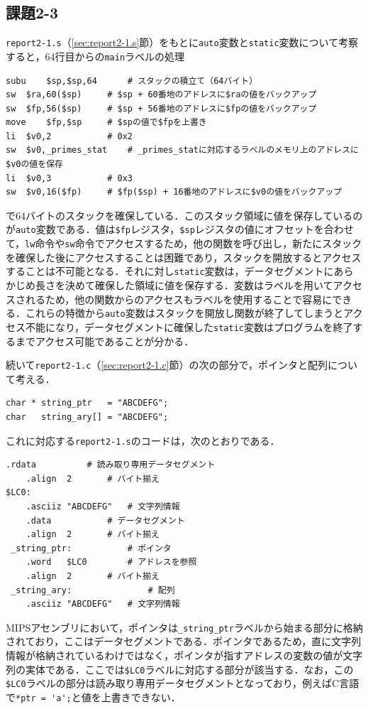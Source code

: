 \subsection{課題2-3}
\verb|report2-1.s|（\ref{sec:report2-1.s}節）をもとに\verb|auto|変数と\verb|static|変数について考察すると，64行目からの\verb|main|ラベルの処理
\begin{Verbatim}[fontsize=\small, baselinestretch=0.8]
subu	$sp,$sp,64		# スタックの積立て（64バイト）
sw	$ra,60($sp)		# $sp + 60番地のアドレスに$raの値をバックアップ
sw	$fp,56($sp)		# $sp + 56番地のアドレスに$fpの値をバックアップ
move	$fp,$sp		# $spの値で$fpを上書き
li	$v0,2			# 0x2
sw	$v0,_primes_stat	# _primes_statに対応するラベルのメモリ上のアドレスに$v0の値を保存
li	$v0,3			# 0x3
sw	$v0,16($fp)		# $fp($sp) + 16番地のアドレスに$v0の値をバックアップ
\end{Verbatim}
で64バイトのスタックを確保している．このスタック領域に値を保存しているのが\verb|auto|変数である．値は\verb|$fp|レジスタ，\verb|$sp|レジスタの値にオフセットを合わせて，\verb|lw|命令や\verb|sw|命令でアクセスするため，他の関数を呼び出し，新たにスタックを確保した後にアクセスすることは困難であり，スタックを開放するとアクセスすることは不可能となる．それに対し\verb|static|変数は，データセグメントにあらかじめ長さを決めて確保した領域に値を保存する．変数はラベルを用いてアクセスされるため，他の関数からのアクセスもラベルを使用することで容易にできる．これらの特徴から\verb|auto|変数はスタックを開放し関数が終了してしまうとアクセス不能になり，データセグメントに確保した\verb|static|変数はプログラムを終了するまでアクセス可能であることが分かる．

続いて\verb|report2-1.c|（\ref{sec:report2-1.c}節）の次の部分で，ポインタと配列について考える．
\begin{Verbatim}[fontsize=\small, baselinestretch=0.8]
char * string_ptr   = "ABCDEFG";
char   string_ary[] = "ABCDEFG";
\end{Verbatim}

\noindent これに対応する\verb|report2-1.s|のコードは，次のとおりである．
\begin{Verbatim}[fontsize=\small, baselinestretch=0.8]
	.rdata			# 読み取り専用データセグメント
	.align	2		# バイト揃え
$LC0:
 	.asciiz	"ABCDEFG"	# 文字列情報
 	.data			# データセグメント
 	.align	2		# バイト揃え
 _string_ptr:			# ポインタ
 	.word	$LC0		# アドレスを参照
 	.align	2		# バイト揃え
 _string_ary:				# 配列
 	.asciiz	"ABCDEFG"	# 文字列情報
\end{Verbatim}

MIPSアセンブリにおいて，ポインタは\verb|_string_ptr|ラベルから始まる部分に格納されており，ここはデータセグメントである．ポインタであるため，直に文字列情報が格納されているわけではなく，ポインタが指すアドレスの変数の値が文字列の実体である．ここでは\verb|$LC0|ラベルに対応する部分が該当する．なお，この\verb|$LC0|ラベルの部分は読み取り専用データセグメントとなっており，例えばC言語で\verb|*ptr = 'a';|と値を上書きできない．

